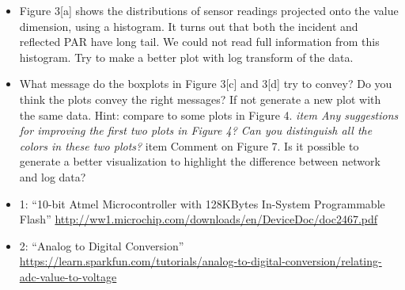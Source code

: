 \documentclass[]{article}
\begin{document}
\begin{itemize}
\item
  Figure 3{[}a{]} shows the distributions of sensor readings projected
  onto the value dimension, using a histogram. It turns out that both
  the incident and reflected PAR have long tail. We could not read full
  information from this histogram. Try to make a better plot with log
  transform of the data.
\item
  What message do the boxplots in Figure 3{[}c{]} and 3{[}d{]} try to
  convey? Do you think the plots convey the right messages? If not
  generate a new plot with the same data. Hint: compare to some plots in
  Figure 4. \emph{item Any suggestions for improving the first two plots
  in Figure 4? Can you distinguish all the colors in these two plots?
  }item Comment on Figure 7. Is it possible to generate a better
  visualization to highlight the difference between network and log
  data?
\item
  1: ``10-bit Atmel Microcontroller with 128KBytes In-System
  Programmable Flash''
  \url{http://ww1.microchip.com/downloads/en/DeviceDoc/doc2467.pdf}
\item
  2: ``Analog to Digital Conversion''
  \url{https://learn.sparkfun.com/tutorials/analog-to-digital-conversion/relating-adc-value-to-voltage}
\end{itemize}
\end{document}
